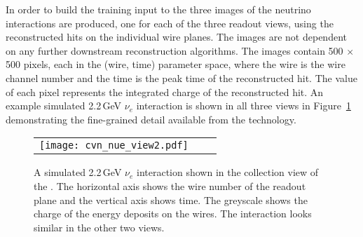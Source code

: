 In order to build the training input to the   three images of the neutrino interactions are produced, one for each of the three readout views, using the reconstructed hits on the individual wire planes. The images are not dependent on any further downstream reconstruction algorithms. The images contain 500 $\times$ 500 pixels, each in the (wire, time) parameter space, where the wire is the wire channel number and the time is the peak time of the reconstructed hit. 
The value of each pixel represents the integrated charge of the reconstructed hit. An example simulated 2.2\,GeV $\nu_{e}$  interaction is shown in all three views in Figure~\ref{fig:views} demonstrating the fine-grained detail available from the  technology.

\begin{figure}[htb] 
\centering
	\begin{tabular}{ccc}
		\texttt{[image: cvn\_nue\_view2.pdf]}
    \end{tabular}
\caption{A simulated 2.2\,GeV $\nu_{e}$  interaction shown in the collection view of the  . The horizontal axis shows the wire number of the readout plane and the vertical axis shows time. The greyscale shows the charge of the energy deposits on the wires. The interaction looks similar in the other two views.}
	\label{fig:views}
\end{figure}


